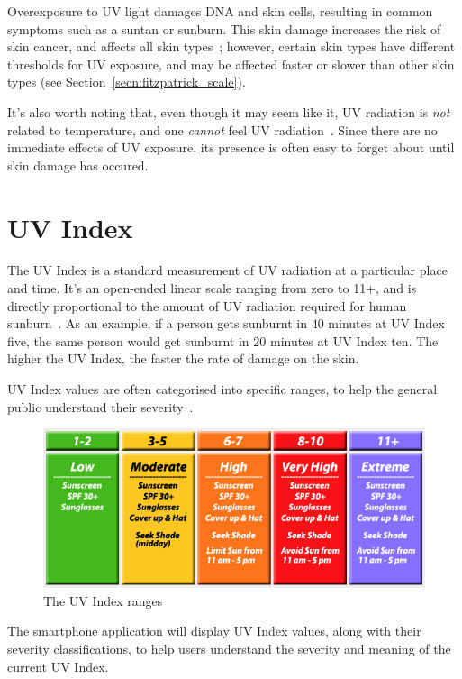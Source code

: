 \documentclass[12pt,openany,a4paper]{book}
\newcommand{\fig}[1]  {Fig.\,\ref{#1}}		%
\newcommand{\secn}[1] {Section~\ref{#1}}	%
\begin{document}
Overexposure to UV light damages DNA and skin cells, resulting in common
symptoms such as a suntan or sunburn. This skin damage increases the risk of skin
cancer, and affects all skin types~\cite{nasa}; however, certain skin types have
different thresholds for UV exposure, and may be affected faster or slower than
other skin types (see \secn{secn:fitzpatrick_scale}).

It's also worth noting that, even though it may seem like it, UV radiation is
\emph{not} related to temperature, and one \emph{cannot} feel UV
radiation~\cite{cancer_council}. Since there are no immediate effects of UV exposure, its
presence is often easy to forget about until skin damage has occured.

\section{UV Index}

The UV Index is a standard measurement of UV radiation at a particular place and
time. It's an open-ended linear scale ranging from zero to 11+, and is directly
proportional to the amount of UV radiation required for human sunburn~\cite{australia_government}.
As an example, if a person gets sunburnt in 40 minutes at UV Index five, the same
person would get sunburnt in 20 minutes at UV Index ten. The higher the UV Index,
the faster the rate of damage on the skin.

UV Index values are often categorised into specific ranges, to help the
general public understand their severity~\cite[\fig{fig:uv_index}]{foresthill_weather}.

\begin{figure}[h]
\centerline{\includegraphics[width=\textwidth]{UVIndex.png}}
\caption{The UV Index ranges}
\label{fig:uv_index}
\end{figure}

The smartphone application will display UV Index values, along with their
severity classifications, to help users understand the severity and meaning of
the current UV Index.
\end{document}
